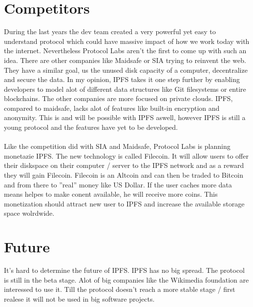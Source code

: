 \documentclass[a4paper,11pt, oneside]{report}
\theoremstyle{definition}
\begin{document}
\section{Competitors}
During the last years the dev team created a very powerful yet easy to understand protocol which could have  massive impact of how we work today with the internet. Nevertheless Protocol Labs aren't the first to come up with such an idea.
There are other companies like Maidsafe \cite{Maidsafe} or SIA  \cite{sia} trying to reinvent the web. They have a similar goal, us the unused disk capacity of a computer, decentralize and secure the data. In my opinion, IPFS takes it one step further by enabling developers to model alot of different data structures like Git filesystems or entire blockchains. The other companies are more focused on private clouds. IPFS, compared to maidsafe, lacks alot of features like built-in encryption and anonymity. This is and will be possible with IPFS aswell, however IPFS is still a young protocol and the features have yet to be developed.\\ \\
Like the competition did with SIA and Maidsafe, Protocol Labs is planning monetazie IPFS. The new technology is called Filecoin. It will allow users to offer their diskspace on their computer / server to the IPFS network and as a reward they will gain Filecoin. Filecoin is an Altcoin and can then be traded to Bitcoin and from there to ''real'' money like US Dollar. If the user caches more data means helpes to make conent available, he will receive more coins. This monetization should attract new user to IPFS and increase the available storage space wolrdwide.

\section{Future}
It's hard to determine the future of IPFS.  IPFS has no big spread. The protocol is still in the beta stage. Alot of big companies like the Wikimedia foundation  are interessed to use it.  Till the protocol doesn't reach a more stable stage / first realese  it will not be used in big software projects.\\
\end{document}
